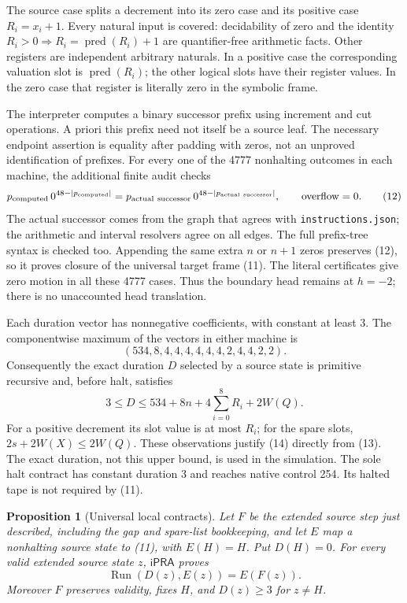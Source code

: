 \documentclass[11pt]{article}
\newtheorem{proposition}[theorem]{Proposition}
\newcommand{\ipra}{\mathsf{iPRA}}
\newcommand{\Run}{\operatorname{Run}}
\begin{document}
The source case splits a decrement into its zero case and its positive
case $R_i=x_i+1$.  Every natural input is covered: decidability of zero
and the identity $R_i>0\Rightarrow R_i=\operatorname{pred}(R_i)+1$
are quantifier-free arithmetic facts.  Other registers are independent
arbitrary naturals.  In a positive case the corresponding valuation
slot is $\operatorname{pred}(R_i)$; the other logical slots have their
register values.  In the zero case that register is literally zero in
the symbolic frame.

The interpreter computes a binary successor prefix using increment
and cut operations.  A priori this prefix need not itself be a source
leaf.  The necessary endpoint assertion is equality after padding with
zeros, not an unproved identification of prefixes.  For every one of
the 4777 nonhalting outcomes in each machine, the additional finite audit
checks
\[
 p_{\rm computed}\,0^{48-|p_{\rm computed}|}
  =p_{\rm actual\ successor}\,0^{48-|p_{\rm actual\ successor}|},
 \qquad \mathrm{overflow}=0.                                    \tag{12}
\]
The actual successor comes from the graph that agrees with
\texttt{instructions.json}; the arithmetic and interval resolvers agree
on all edges.  The full prefix-tree syntax is checked too.  Appending
the same extra $n$ or $n+1$ zeros preserves (12), so it proves closure
of the universal target frame (11).  The literal certificates give zero
motion in all these 4777 cases.  Thus the boundary head remains at
$h=-2$; there is no unaccounted head translation.

Each duration vector has nonnegative coefficients, with constant at
least 3.  The componentwise maximum of the vectors in either machine is
\[
 (534,8,4,4,4,4,4,4,2,4,4,2,2).                                \tag{13}
\]
Consequently the exact duration $D$ selected by a source state is
primitive recursive and, before halt, satisfies
\[
 3\leq D\leq534+8n+4\sum_{i=0}^{8}R_i+2W(Q).                  \tag{14}
\]
For a positive decrement its slot value is at most $R_i$; for the spare
slots, $2s+2W(X)\leq2W(Q)$.  These observations justify (14) directly
from (13).  The exact duration, not this upper bound, is used in the
simulation.  The sole halt contract has constant duration 3 and reaches
native control 254.  Its halted tape is not required by (11).

\begin{proposition}[Universal local contracts]
Let $F$ be the extended source step just described, including the gap
and spare-list bookkeeping, and let $E$ map a nonhalting source state
to (11), with $E(H)=H$.  Put $D(H)=0$.  For every valid extended source
state $z$, $\ipra$ proves
\[
 \Run(D(z),E(z))=E(F(z)).                                       \tag{15}
\]
Moreover $F$ preserves validity, fixes $H$, and $D(z)\geq3$ for
$z\neq H$.
\end{proposition}
\end{document}
